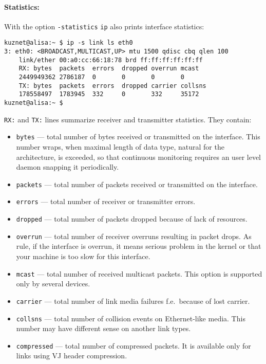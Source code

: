 \paragraph{Statistics:} With the option \verb|-statistics| \verb|ip| also
prints interface statistics:

\begin{verbatim}
kuznet@alisa:~ $ ip -s link ls eth0
3: eth0: <BROADCAST,MULTICAST,UP> mtu 1500 qdisc cbq qlen 100
    link/ether 00:a0:cc:66:18:78 brd ff:ff:ff:ff:ff:ff
    RX: bytes  packets  errors  dropped overrun mcast   
    2449949362 2786187  0       0       0       0      
    TX: bytes  packets  errors  dropped carrier collsns 
    178558497  1783945  332     0       332     35172  
kuznet@alisa:~ $
\end{verbatim}
\verb|RX:| and \verb|TX:| lines summarize receiver and transmitter
statistics. They contain:
\begin{itemize}
\item \verb|bytes| --- total number of bytes received or transmitted
on the interface. This number wraps, when maximal length of data type,
natural for the architecture, is exceeded, so that continuous monitoring requires
an user level daemon snapping it periodically.
\item \verb|packets| --- total number of packets received or transmitted
on the interface.
\item \verb|errors| --- total number of receiver or transmitter errors.
\item \verb|dropped| --- total number of packets dropped because of lack
of resources.
\item \verb|overrun| --- total number of receiver overruns resulting
in packet drops. As rule, if the interface is overrun, it means
serious problem in the kernel or that your machine is too slow
for this interface.
\item \verb|mcast| --- total number of received multicast packets. This option
is supported only by several devices.
\item \verb|carrier| --- total number of link media failures f.e.\ because
of lost carrier.
\item \verb|collsns| --- total number of collision events
on Ethernet-like media. This number may have different sense on another
link types.
\item \verb|compressed| --- total number of compressed packets. It is
available only for links using VJ header compression.
\end{itemize}


